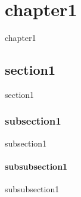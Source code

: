 \chapter{chapter1}

chapter1

\section{section1}

section1

\subsection{subsection1}

subsection1

\subsubsection{subsubsection1}

subsubsection1